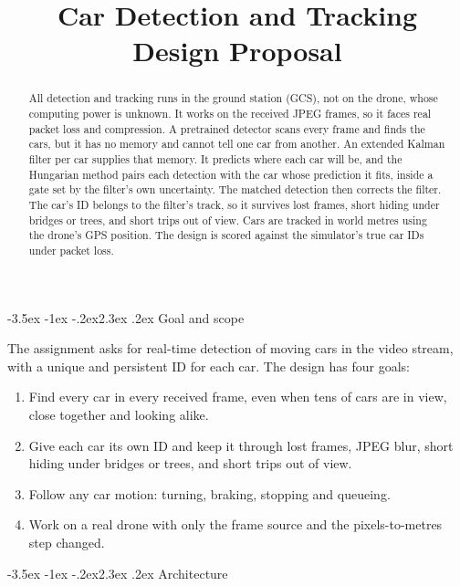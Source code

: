 \documentclass[11pt]{article}
\title{\color{accent}\textbf{Car Detection and Tracking}\\Design Proposal}
\date{}
\makeatletter
\renewcommand\section{\@startsection{section}{1}{\z@}%
  {-3.5ex \@plus -1ex \@minus -.2ex}{2.3ex \@plus .2ex}%
  {\normalfont\Large\bfseries\color{accent}}}
\makeatother
\begin{document}

\maketitle

\begin{abstract}
All detection and tracking runs in the ground station (GCS), not on the
drone, whose computing power is unknown. It works on the received JPEG
frames, so it faces real packet loss and compression. A pretrained detector
scans every frame and finds the cars, but it has no memory and cannot tell
one car from another. An extended Kalman filter per car supplies that
memory. It predicts where each car will be, and the Hungarian method pairs
each detection with the car whose prediction it fits, inside a gate set by
the filter's own uncertainty. The matched detection then corrects the
filter. The car's ID belongs to the filter's track, so it survives lost
frames, short hiding under bridges or trees, and short trips out of view.
Cars are tracked in world metres using the drone's GPS position. The design
is scored against the simulator's true car IDs under packet loss.
\end{abstract}

\section{Goal and scope}

The assignment asks for real-time detection of moving cars in the video
stream, with a unique and persistent ID for each car. The design has four
goals:

\begin{enumerate}
  \item Find every car in every received frame, even when tens of cars are
        in view, close together and looking alike.
  \item Give each car its own ID and keep it through lost frames, JPEG
        blur, short hiding under bridges or trees, and short trips out of
        view.
  \item Follow any car motion: turning, braking, stopping and queueing.
  \item Work on a real drone with only the frame source and the
        pixels-to-metres step changed.
\end{enumerate}

\section{Architecture}
\end{document}
